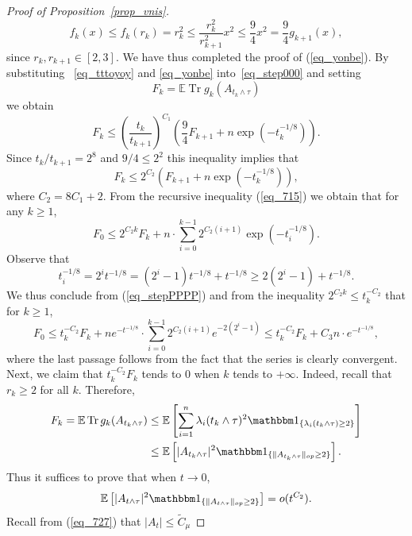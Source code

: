 \documentclass[12pt,a4paper]{article}
\newcommand{\Tr}{\mathop{\mathrm{Tr}}\nolimits}
\newcommand{\E}{\mathbb{E}}
\renewcommand{\tilde}{\widetilde}
\theoremstyle{definition}
\begin{document}
\begin{proof}[Proof of Proposition~\ref{prop_vnis}]
\[
f_k (x) \leq f_k (r_k) = r_k^2 \leq \frac{ r_k^2}{ r_{k+1}^2 } x^2 \leq \frac 94 x^2 = \frac 94 g_{k+1} (x),
\]
since $r_{k}, r_{k+1} \in [2,3]$. We have thus completed the proof of (\ref{eq_yonbe}).
By substituting ~\eqref{eq_tttoyoy} and \eqref{eq_yonbe}  into~\eqref{eq_step000}
and setting
\[
F_k = \E \Tr g_k ( A_{t_k \wedge \tau} )
\]
we  obtain
\[
F_k \leq \left( \frac{t_k}{t_{k+1}} \right)^{C_1} \left( \frac 94 F_{k+1} + n \exp ( - t_{k}^{-1/8} ) \right) .
\]
Since $t_{k}/t_{k+1} = 2^8$ and $9/4 \leq 2^2$
this inequality implies that
\begin{equation} 
F_k \leq 2^{C_2} \left( F_{k+1} + n \exp ( - t_{k}^{-1/8} ) \right) ,
\label{eq_715} \end{equation}
where $C_2 = 8C_1 + 2$. From the recursive inequality (\ref{eq_715}) we obtain that for any $k \geq 1$,
\begin{equation}\label{eq_stepPPPP}
 F_0  \leq 2^{C_2 k} F_k + n
\cdot \sum_{i=0}^{k-1}
2^{C_2 (i+1)} \exp ( - t_{i}^{-1/8}).
\end{equation}
Observe that
\[
t_i^{-1/8}  = 2^i t^{-1/8}
= (2^i-1)t^{-1/8} + t^{-1/8} \geq 2 (2^i-1) + t^{-1/8}.
\]
We thus conclude from (\ref{eq_stepPPPP}) 
and from the inequality $2^{C_2 k} \leq t_k^{-C_2}$ that for $k \geq 1$,
\begin{equation}  F_0 \leq t_k^{-C_2} F_k + n e^{-t^{-1/8}} 
\cdot \sum_{i=0}^{k-1}
2^{C_2 (i+1)} e^{ - 2 (2^i-1) }
\leq t_k^{-C_2} F_k + C_3 n \cdot e^{-t^{-1/8}},
 \label{eq_5666} \end{equation}
where the last passage follows from the fact that the series is clearly convergent. 
Next, we claim that  $t_k^{-C_2} F_k$ tends to $0$
when $k$ tends to $+\infty$.
Indeed, recall that $r_k \geq 2 $ for all $k$. Therefore,
\[
\begin{split}
F_k = \E \Tr g_k ( A _{t_k \wedge \tau} )
& \leq \E \left[ \sum_{i=1}^n \lambda_i ( t_k \wedge \tau )^2
\mathbbm 1_{\{ \lambda_i ( t_k \wedge \tau ) \geq 2 \} } \right]  \\
& \leq  \E \left[ \vert A_{t_k\wedge \tau} \vert^2
\mathbbm 1_{\{ \Vert A_{t_k\wedge \tau} \Vert_{op} \geq 2 \} }\right].
\end{split}
\]
Thus  it suffices to prove that when $t \to 0$,
\begin{equation}\label{eq_enough}
 \E \left[ \vert A_{t\wedge \tau} \vert^2
\mathbbm 1_{ \{ \Vert A_{t\wedge \tau} \Vert_{op} \geq 2 \} } \right] = o(t^{C_2}).
\end{equation}
Recall from (\ref{eq_727}) that $\vert A_t \vert \leq \tilde{C}_{\mu}$

\end{proof}
\end{document}
